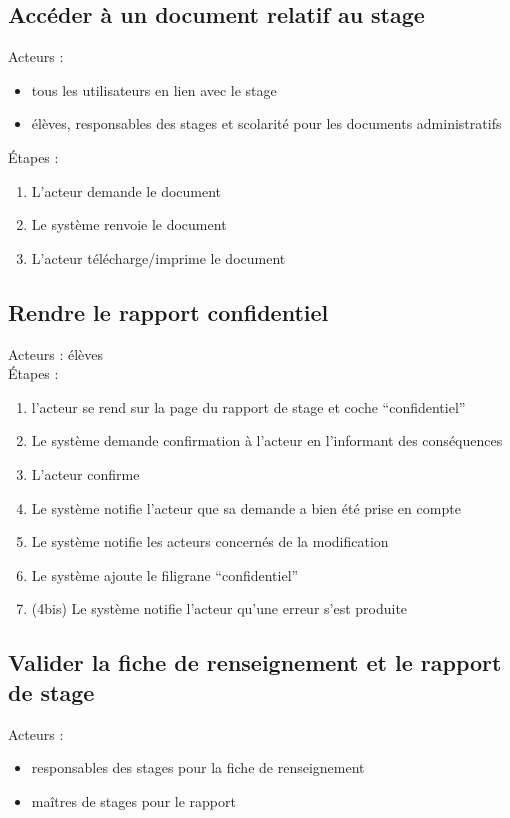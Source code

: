 \documentclass{scrreprt}
\begin{document}
\subsection{Acc\'eder \`a un document relatif au stage}
Acteurs :
\begin{itemize}
\item tous les utilisateurs en lien avec le stage
\item \'el\`eves, responsables des stages et scolarit\'e pour les documents administratifs
\end{itemize}
\'Etapes :
\begin{enumerate}
\item L’acteur demande le document
\item Le syst\`eme renvoie le document
\item L’acteur t\'el\'echarge/imprime le document
\end{enumerate}


\subsection{Rendre le rapport confidentiel}
Acteurs : élèves
\\
\'Etapes : 
\begin{enumerate}
\item l’acteur se rend sur la page du rapport de stage et coche “confidentiel”
\item Le système demande confirmation à l’acteur en l’informant des conséquences
\item L’acteur confirme 
\item Le système notifie l’acteur que sa demande a bien été prise en compte
\item Le système notifie les acteurs concernés de la modification
\item Le système ajoute le filigrane “confidentiel” 
\item (4bis) Le système notifie l’acteur qu’une erreur s’est produite 
\end{enumerate}


\subsection{Valider la fiche de renseignement et le rapport de stage}
Acteurs :
\begin{itemize}
\item responsables des stages pour la fiche de renseignement
\item maîtres de stages pour le rapport
\end{itemize}
\end{document}
